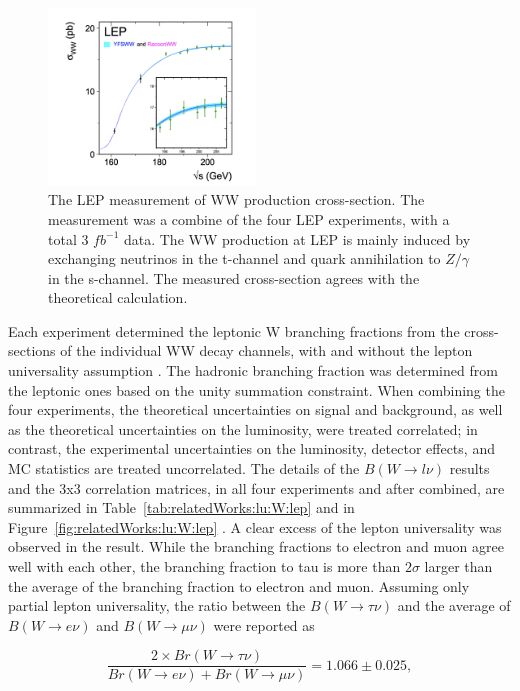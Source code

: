 \begin{figure}[ht]
    \centering
    \includegraphics[width=0.49\textwidth]{chapters/RelatedWorks/sectionLU/figures/lep_ww.png}
    \caption{The LEP measurement of WW production cross-section. The measurement was a combine of the four LEP experiments, with a total 3 $fb^{-1}$  data. The WW production at LEP is mainly induced by exchanging neutrinos in the t-channel and quark annihilation to $Z/\gamma$  in the s-channel. The measured cross-section agrees with the theoretical calculation.}
    \label{fig:my_label}
\end{figure}

Each experiment determined the leptonic W branching fractions from the cross-sections of the individual WW decay channels, with and without the lepton universality assumption \cite{Schael:2013ita}. The hadronic branching fraction was determined from the leptonic ones based on the unity summation constraint. When combining the four experiments, the theoretical uncertainties on signal and background, as well as the theoretical uncertainties on the luminosity, were treated correlated; in contrast, the experimental uncertainties on the luminosity, detector effects, and MC statistics are treated uncorrelated. The details of the $B(W\to l \nu)$ results and the 3x3 correlation matrices, in all four experiments and after combined, are summarized in Table~\ref{tab:relatedWorks:lu:W:lep} and in Figure~\ref{fig:relatedWorks:lu:W:lep} . A clear excess of the lepton universality was observed in the result. While the branching fractions to electron and muon agree well with each other, the branching fraction to tau is more than $2 \sigma$ larger than the average of the branching fraction to electron and muon. Assuming only partial lepton universality, the ratio between the $B(W\to \tau \nu)$ and the average of $B(W\to e \nu)$ and $B(W\to \mu \nu)$ were reported as \cite{Schael:2013ita}



\begin{equation*}
    \frac{2\times Br(W\to \tau \nu)}{Br(W\to e \nu)+ Br(W\to \mu  \nu)} = 1.066 \pm 0.025,
\end{equation*}

